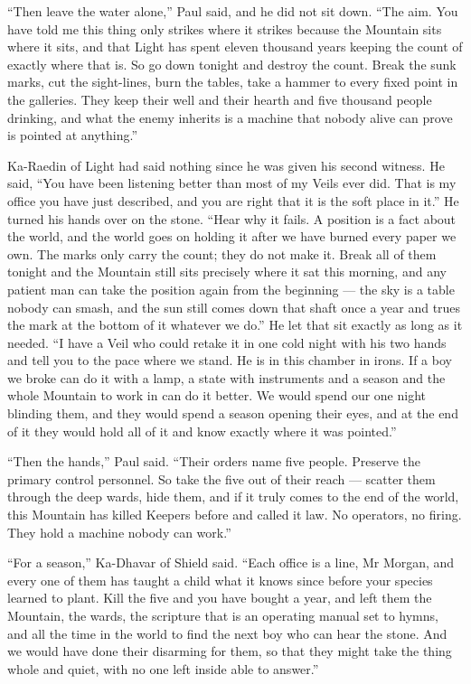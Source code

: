 ``Then leave the water alone,'' Paul said, and he did not sit down. ``The aim. You have told me this thing only strikes where it strikes because the Mountain sits where it sits, and that Light has spent eleven thousand years keeping the count of exactly where that is. So go down tonight and destroy the count. Break the sunk marks, cut the sight-lines, burn the tables, take a hammer to every fixed point in the galleries. They keep their well and their hearth and five thousand people drinking, and what the enemy inherits is a machine that nobody alive can prove is pointed at anything.''\par

Ka-Raedin of Light had said nothing since he was given his second witness. He said, ``You have been listening better than most of my Veils ever did. That is my office you have just described, and you are right that it is the soft place in it.'' He turned his hands over on the stone. ``Hear why it fails. A position is a fact about the world, and the world goes on holding it after we have burned every paper we own. The marks only carry the count; they do not make it. Break all of them tonight and the Mountain still sits precisely where it sat this morning, and any patient man can take the position again from the beginning --- the sky is a table nobody can smash, and the sun still comes down that shaft once a year and trues the mark at the bottom of it whatever we do.'' He let that sit exactly as long as it needed. ``I have a Veil who could retake it in one cold night with his two hands and tell you to the pace where we stand. He is in this chamber in irons. If a boy we broke can do it with a lamp, a state with instruments and a season and the whole Mountain to work in can do it better. We would spend our one night blinding them, and they would spend a season opening their eyes, and at the end of it they would hold all of it and know exactly where it was pointed.''\par

``Then the hands,'' Paul said. ``Their orders name five people. Preserve the primary control personnel. So take the five out of their reach --- scatter them through the deep wards, hide them, and if it truly comes to the end of the world, this Mountain has killed Keepers before and called it law. No operators, no firing. They hold a machine nobody can work.''\par

``For a season,'' Ka-Dhavar of Shield said. ``Each office is a line, Mr Morgan, and every one of them has taught a child what it knows since before your species learned to plant. Kill the five and you have bought a year, and left them the Mountain, the wards, the scripture that is an operating manual set to hymns, and all the time in the world to find the next boy who can hear the stone. And we would have done their disarming for them, so that they might take the thing whole and quiet, with no one left inside able to answer.''\par

